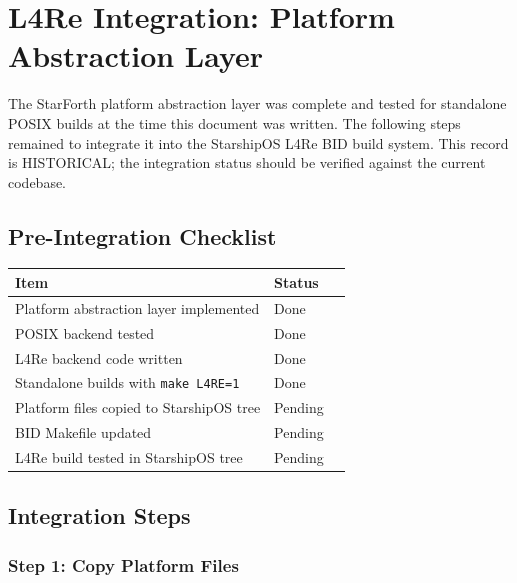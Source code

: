 
\section{L4Re Integration: Platform Abstraction Layer}

The StarForth platform abstraction layer was complete and tested for
standalone POSIX builds at the time this document was written. The following
steps remained to integrate it into the StarshipOS L4Re BID build system.
This record is HISTORICAL; the integration status should be verified against
the current codebase.

\subsection{Pre-Integration Checklist}

\begin{center}
\begin{tabular}{lll}
\toprule
Item & Status \\
\midrule
Platform abstraction layer implemented          & Done \\
POSIX backend tested                            & Done \\
L4Re backend code written                       & Done \\
Standalone builds with \texttt{make L4RE=1}     & Done \\
Platform files copied to StarshipOS tree        & Pending \\
BID Makefile updated                            & Pending \\
L4Re build tested in StarshipOS tree            & Pending \\
\bottomrule
\end{tabular}
\end{center}

\subsection{Integration Steps}

\subsubsection{Step 1: Copy Platform Files}


